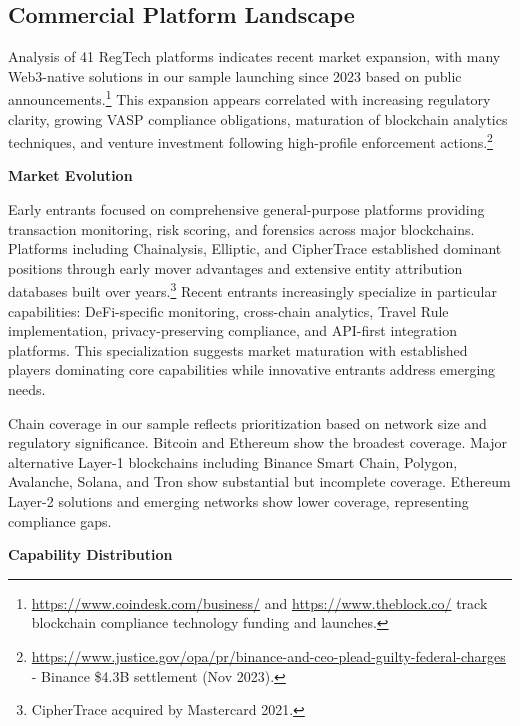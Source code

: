 \documentclass[conference,compsoc]{IEEEtran}
\begin{document}
\subsection{Commercial Platform Landscape}

Analysis of 41 RegTech platforms indicates recent market expansion, with many Web3-native solutions in our sample launching since 2023 based on public announcements.\footnote{\url{https://www.coindesk.com/business/} and \url{https://www.theblock.co/} track blockchain compliance technology funding and launches.} This expansion appears correlated with increasing regulatory clarity, growing VASP compliance obligations, maturation of blockchain analytics techniques, and venture investment following high-profile enforcement actions.\footnote{\url{https://www.justice.gov/opa/pr/binance-and-ceo-plead-guilty-federal-charges} - Binance \$4.3B settlement (Nov 2023).}

\noindent\textbf{Market Evolution}

Early entrants focused on comprehensive general-purpose platforms providing transaction monitoring, risk scoring, and forensics across major blockchains. Platforms including Chainalysis, Elliptic, and CipherTrace established dominant positions through early mover advantages and extensive entity attribution databases built over years.\footnote{CipherTrace acquired by Mastercard 2021.} Recent entrants increasingly specialize in particular capabilities: DeFi-specific monitoring, cross-chain analytics, Travel Rule implementation, privacy-preserving compliance, and API-first integration platforms. This specialization suggests market maturation with established players dominating core capabilities while innovative entrants address emerging needs.

Chain coverage in our sample reflects prioritization based on network size and regulatory significance. Bitcoin and Ethereum show the broadest coverage. Major alternative Layer-1 blockchains including Binance Smart Chain, Polygon, Avalanche, Solana, and Tron show substantial but incomplete coverage. Ethereum Layer-2 solutions and emerging networks show lower coverage, representing compliance gaps.

\noindent\textbf{Capability Distribution}
\end{document}

